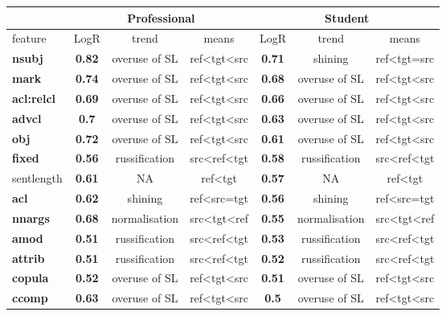 \begin{longtable}[H]{p{1.6cm}|ccc||ccc}
	\toprule
		      &      \multicolumn{3}{c}{Professional} 	&      \multicolumn{3}{c}{Student}\\
	\midrule
	feature & LogR & trend & means   & LogR & trend   & means   \\
	\midrule
	\textbf{nsubj}   & \textbf{0.82} & overuse of SL  & ref\textless{}tgt\textless{}src & \textbf{0.71} & shining & ref\textless{}tgt=src  \\
	\textbf{mark} & \textbf{0.74} & overuse of SL  & ref\textless{}tgt\textless{}src & \textbf{0.68} & overuse of SL & ref\textless{}tgt\textless{}src \\
	\textbf{acl:relcl}  & \textbf{0.69} & overuse of SL  & ref\textless{}tgt\textless{}src & \textbf{0.66} & overuse of SL & ref\textless{}tgt\textless{}src \\
	\textbf{advcl}   & \textbf{0.7}  & overuse of SL  & ref\textless{}tgt\textless{}src & \textbf{0.63} & overuse of SL & ref\textless{}tgt\textless{}src \\
	\textbf{obj}  & \textbf{0.72} & overuse of SL  & ref\textless{}tgt\textless{}src & \textbf{0.61} & overuse of SL & ref\textless{}tgt\textless{}src \\
	\textbf{fixed}   & \textbf{0.56} & russification  & src\textless{}ref\textless{}tgt & \textbf{0.58} & russification & src\textless{}ref\textless{}tgt \\
	sentlength & \textbf{0.61} & NA  & ref\textless{}tgt & \textbf{0.57} & NA & ref\textless{}tgt \\
	\textbf{acl}  & \textbf{0.62} & shining  & ref\textless{}src=tgt  & \textbf{0.56} & shining & ref\textless{}src=tgt  \\
	\textbf{nnargs}  & \textbf{0.68} & normalisation  & src\textless{}tgt\textless{}ref & \textbf{0.55} & normalisation & src\textless{}tgt\textless{}ref \\
	\textbf{amod} & \textbf{0.51} & russification  & src\textless{}ref\textless{}tgt & \textbf{0.53} & russification & src\textless{}ref\textless{}tgt \\
	\textbf{attrib}  & \textbf{0.51} & russification  & src\textless{}ref\textless{}tgt & \textbf{0.52} & russification & src\textless{}ref\textless{}tgt \\
	\textbf{copula}  & \textbf{0.52} & overuse of SL  & ref\textless{}tgt\textless{}src & \textbf{0.51} & overuse of SL & ref\textless{}tgt\textless{}src \\
	\textbf{ccomp}   & \textbf{0.63} & overuse of SL  & ref\textless{}tgt\textless{}src & \textbf{0.5}  & overuse of SL & ref\textless{}tgt\textless{}src \\

\end{longtable}
